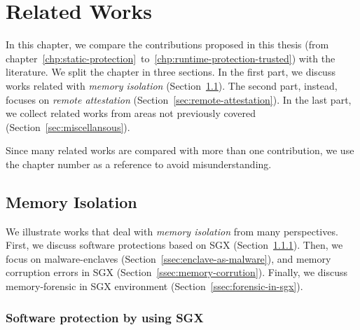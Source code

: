 \chapter{Related Works}
\label{chp:related-works}

In this chapter, we compare the contributions proposed in this thesis (from 
chapter~\ref{chp:static-protection}~to~\ref{chp:runtime-protection-trusted}) 
with the literature.
We split the chapter in three sections. 
In the first part, we discuss works related with \emph{memory isolation} 
(Section~\ref{sec:memory-isolation}).
The second part, instead, focuses on \emph{remote attestation} 
(Section~\ref{sec:remote-attestation}).
In the last part, we collect related works from areas not previously covered 
(Section~\ref{sec:miscellansous}).

Since many related works are compared with more than one contribution, we use 
the chapter number as a reference to avoid misunderstanding.

\section{Memory Isolation}
\label{sec:memory-isolation}

We illustrate works that deal with \emph{memory isolation} from many 
perspectives.
First, we discuss software protections based on SGX 
(Section~\ref{ssec:software-protection-by-using-sgx}).
Then, we focus on malware-enclaves (Section~\ref{ssec:enclave-as-malware}), and
memory corruption errors in SGX (Section~\ref{ssec:memory-corrution}).
Finally, we discuss memory-forensic in SGX environment 
(Section~\ref{ssec:forensic-in-sgx}).

\subsection{Software protection by using SGX}
\label{ssec:software-protection-by-using-sgx}

